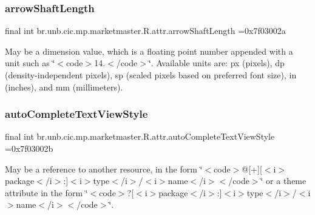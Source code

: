 \subsubsection{\texorpdfstring{arrow\+Shaft\+Length}{arrowShaftLength}}
{\footnotesize\ttfamily final int br.\+unb.\+cic.\+mp.\+marketmaster.\+R.\+attr.\+arrow\+Shaft\+Length =0x7f03002a\hspace{0.3cm}{\ttfamily [static]}}

May be a dimension value, which is a floating point number appended with a unit such as \char`\"{}$<$code$>$14.\+5sp$<$/code$>$\char`\"{}. Available units are\+: px (pixels), dp (density-\/independent pixels), sp (scaled pixels based on preferred font size), in (inches), and mm (millimeters). \mbox{\label{classbr_1_1unb_1_1cic_1_1mp_1_1marketmaster_1_1R_1_1attr_ad81122481bc6653d5591cfcf7b6b333b}} 
\subsubsection{\texorpdfstring{auto\+Complete\+Text\+View\+Style}{autoCompleteTextViewStyle}}
{\footnotesize\ttfamily final int br.\+unb.\+cic.\+mp.\+marketmaster.\+R.\+attr.\+auto\+Complete\+Text\+View\+Style =0x7f03002b\hspace{0.3cm}{\ttfamily [static]}}

May be a reference to another resource, in the form \char`\"{}$<$code$>$@\mbox{[}+\mbox{]}\mbox{[}$<$i$>$package$<$/i$>$\+:\mbox{]}$<$i$>$type$<$/i$>$/$<$i$>$name$<$/i$>$$<$/code$>$\char`\"{} or a theme attribute in the form \char`\"{}$<$code$>$?\mbox{[}$<$i$>$package$<$/i$>$\+:\mbox{]}$<$i$>$type$<$/i$>$/$<$i$>$name$<$/i$>$$<$/code$>$\char`\"{}. \mbox{\label{classbr_1_1unb_1_1cic_1_1mp_1_1marketmaster_1_1R_1_1attr_a85a158376001aee123bbfe55eb90a33f}} 
